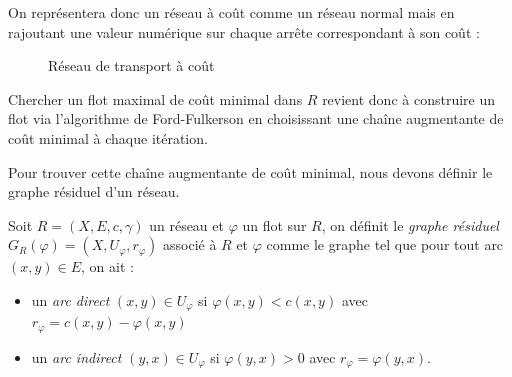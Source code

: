 \begin{example}
    On représentera donc un réseau à coût comme un réseau normal mais en rajoutant une valeur numérique 
    sur chaque arrête correspondant à son coût : 

    \begin{figure}[h]
        \centering 
        \caption{Réseau de transport à coût}
    \end{figure}
\end{example}

\begin{remark}
    Chercher un flot maximal de coût minimal dans $R$ revient donc à construire un flot via l'algorithme de Ford-Fulkerson 
    en choisissant une chaîne augmentante de coût minimal à chaque itération. 
\end{remark}

Pour trouver cette chaîne augmentante de coût minimal, nous devons définir le graphe résiduel d'un réseau. 

\begin{definition}
    Soit $R = (X, E, c, \gamma)$ un réseau et $ \varphi$ un flot sur $R$, on définit 
    le \emph{graphe résiduel} $ G_R( \varphi) = (X, U_{ \varphi}, r_{ \varphi}) $ associé à $R$ et $ \varphi$ 
    comme le graphe tel que pour tout arc $(x,y) \in E$, on ait :
    \begin{itemize}
        \item un \emph{arc direct} $(x,y) \in U_{ \varphi}$ si $ \varphi(x,y) < c(x,y)$ avec $r_{ \varphi} = c(x,y) - \varphi(x,y)$ 
        \item un \emph{arc indirect} $(y,x) \in U_{ \varphi}$ si $ \varphi(y,x) > 0$ avec $ r_\varphi = \varphi(y,x)$. 
    \end{itemize}
\end{definition}



